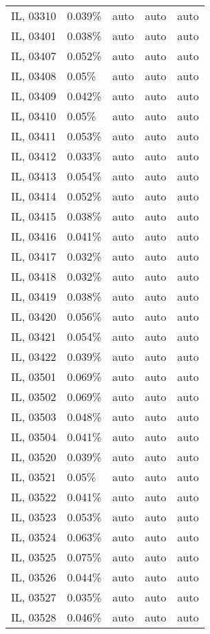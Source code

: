 \begin{longtable}[]{@{}lllll@{}}
IL, 03310 & 0.039\% & auto & auto & auto \\
IL, 03401 & 0.038\% & auto & auto & auto \\
IL, 03407 & 0.052\% & auto & auto & auto \\
IL, 03408 & 0.05\% & auto & auto & auto \\
IL, 03409 & 0.042\% & auto & auto & auto \\
IL, 03410 & 0.05\% & auto & auto & auto \\
IL, 03411 & 0.053\% & auto & auto & auto \\
IL, 03412 & 0.033\% & auto & auto & auto \\
IL, 03413 & 0.054\% & auto & auto & auto \\
IL, 03414 & 0.052\% & auto & auto & auto \\
IL, 03415 & 0.038\% & auto & auto & auto \\
IL, 03416 & 0.041\% & auto & auto & auto \\
IL, 03417 & 0.032\% & auto & auto & auto \\
IL, 03418 & 0.032\% & auto & auto & auto \\
IL, 03419 & 0.038\% & auto & auto & auto \\
IL, 03420 & 0.056\% & auto & auto & auto \\
IL, 03421 & 0.054\% & auto & auto & auto \\
IL, 03422 & 0.039\% & auto & auto & auto \\
IL, 03501 & 0.069\% & auto & auto & auto \\
IL, 03502 & 0.069\% & auto & auto & auto \\
IL, 03503 & 0.048\% & auto & auto & auto \\
IL, 03504 & 0.041\% & auto & auto & auto \\
IL, 03520 & 0.039\% & auto & auto & auto \\
IL, 03521 & 0.05\% & auto & auto & auto \\
IL, 03522 & 0.041\% & auto & auto & auto \\
IL, 03523 & 0.053\% & auto & auto & auto \\
IL, 03524 & 0.063\% & auto & auto & auto \\
IL, 03525 & 0.075\% & auto & auto & auto \\
IL, 03526 & 0.044\% & auto & auto & auto \\
IL, 03527 & 0.035\% & auto & auto & auto \\
IL, 03528 & 0.046\% & auto & auto & auto \\

\end{longtable}
